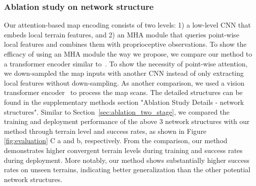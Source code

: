 \documentclass[9pt,twocolumn,twoside]{osajnl}
\begin{document}
\subsubsection{Ablation study on network structure}
Our attention-based map encoding consists of two levels: 1) a low-level CNN that embeds local terrain features, and 2) an MHA module that queries point-wise local features and combines them with proprioceptive observations. To show the efficacy of using an MHA module the way we propose, we compare our method to a transformer encoder similar to~\cite{yang2022learning}. To show the necessity of point-wise attention, we down-sampled the map inputs with another CNN instead of only extracting local features without down-sampling. As another comparison, we used a vision transformer encoder~\cite{vit} to process the map scans. The detailed structures can be found in the supplementary methods section "Ablation Study Details - network structures". Similar to Section~\ref{sec:ablation_two_stage}, we compared the training and deployment performance of the above 3 network structures with our method through terrain level and success rates, as shown in Figure \ref{fig:evaluation} C a and b, respectively. From the comparison, our method demonstrates higher convergent terrain levels during training and success rates during deployment. More notably, our method shows substantially higher success rates on unseen terrains, indicating better generalization than the other potential network structures.
\end{document}
